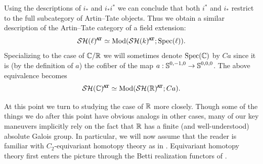 Using the descriptions of $i_*$ and $i_*i^*$ we can conclude that both $i^*$ and $i_*$ restrict to the full subcategory of Artin--Tate objects. Thus we obtain a similar description of the Artin--Tate category of a field extension:
\[ \SH(\ell)^{\at} \simeq \Mod ( \SHkat ; \Spec(\ell) ). \]
Specializing to the case of $\mathbb{C}/\mathbb{R}$ we will sometimes denote $\operatorname{\mathrm{Spec}}(\mathbb{C})$ by $Ca$ since it is (by the definition of $a$) the cofiber of the map $a: \operatorname{\mathbb{S}}^{0,-1,0} \to \operatorname{\mathbb{S}}^{0,0,0}$.
The above equivalence becomes
\[ \SHC^{\at} \simeq \Mod ( \SHR^{\at} ; Ca ). \]

At this point we turn to studying the case of $\mathbb{R}$ more closely.
Though some of the things we do after this point have obvious analogs in other cases,
many of our key maneuvers implicitly rely on the fact that $\mathbb{R}$ has a finite (and well-understood) absolute Galois group.
In particular, we will now assume that the reader is familiar with $C_2$-equivariant homotopy theory as in \cite{HHR}.
Equivariant homotopy theory first enters the picture through the Betti realization functors of \cite[Section 3.3]{MorelVoevodsky}.

